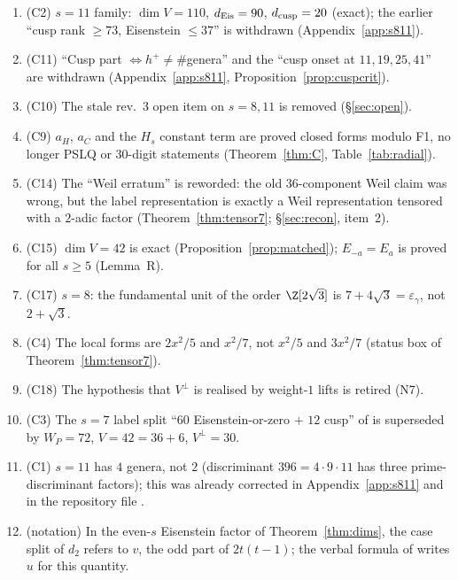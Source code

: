 \begin{enumerate}[label=\textbf{R4.\arabic*},leftmargin=3.2em]
\item (C2) $s=11$ family: $\dim V=110$, $d_{\rm Eis}=90$, $d_{\rm cusp}=20$ (exact); the earlier ``cusp rank $\ge73$, Eisenstein $\le37$'' is withdrawn (Appendix~\ref{app:s811}).
\item (C11) ``Cusp part $\Leftrightarrow h^+\neq\#$genera'' and the ``cusp onset at $11,19,25,41$'' are withdrawn (Appendix~\ref{app:s811}, Proposition~\ref{prop:cuspcrit}).
\item (C10) The stale rev.~3 open item on $s=8,11$ is removed (\S\ref{sec:open}).
\item (C9) $a_H$, $a_C$ and the $H_s$ constant term are proved closed forms modulo F1, no longer PSLQ or 30-digit statements (Theorem~\ref{thm:C}, Table~\ref{tab:radial}).
\item (C14) The ``Weil erratum'' is reworded: the old $36$-component Weil claim was wrong, but the label representation is exactly a Weil representation tensored with a
$2$-adic factor (Theorem~\ref{thm:tensor7}; \S\ref{sec:recon}, item~2).
\item (C15) $\dim V=42$ is exact (Proposition~\ref{prop:matched}); $E_{-a}=E_a$ is proved for all $s\ge5$ (Lemma~R).
\item (C17) $s=8$: the fundamental unit of the order $\Z[2\sqrt3]$ is $7+4\sqrt3=\varepsilon_\gamma$, not $2+\sqrt3$.
\item (C4) The local forms are $2x^2/5$ and $x^2/7$, not $x^2/5$ and $3x^2/7$ (status box of Theorem~\ref{thm:tensor7}).
\item (C18) The hypothesis that $V^\perp$ is realised by weight-$1$ lifts is retired (N7).
\item (C3) The $s=7$ label split ``$60$ Eisenstein-or-zero $+$ $12$ cusp'' of  is superseded by $W_P=72$, $V=42=36+6$, $V^\perp=30$.
\item (C1) $s=11$ has $4$ genera, not $2$ (discriminant $396=4\cdot9\cdot11$ has three prime-discriminant factors); this was already corrected in Appendix~\ref{app:s811} and in the repository file .
\item (notation) In the even-$s$ Eisenstein factor of Theorem~\ref{thm:dims}, the case split of $d_2$ refers to $v$, the odd part of $2t(t-1)$; the verbal formula of  writes $u$ for this quantity.
\end{enumerate}

